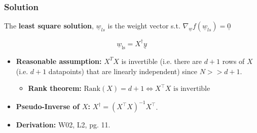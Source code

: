     \subsubsection{Solution}
    \begin{definition}
        The \textbf{least square solution}, $\underline{w}_{ls}$ is the weight vector s.t. $\nabla_{\underline{w}} f \left(\underline{w}_{ls} \right) = \underline{0}$

        \begin{equation}
            \underline{w}_{\text{ls}} = X^{\dagger} \underline{y} 
        \end{equation}
        \begin{itemize}
            \item \textbf{Reasonable assumption:} $X^T X$ is invertible (i.e. there are $d+1$ rows of $X$ (i.e. $d+1$ datapoints) that are linearly independent) since $N >> d+1$.
            \begin{itemize}
                \item \textbf{Rank theorem:} $\text{Rank}(X) = d+1 \iff X^{\top} X \text{ is invertible}$
            \end{itemize}
            \item \textbf{Pseudo-Inverse of $X$:} $X^{\dagger} = \left( X^{\top} X \right)^{-1} X^{\top}$.
            
            \item \textbf{Derivation:} W02, L2, pg. 11.
        \end{itemize}
    \end{definition}

